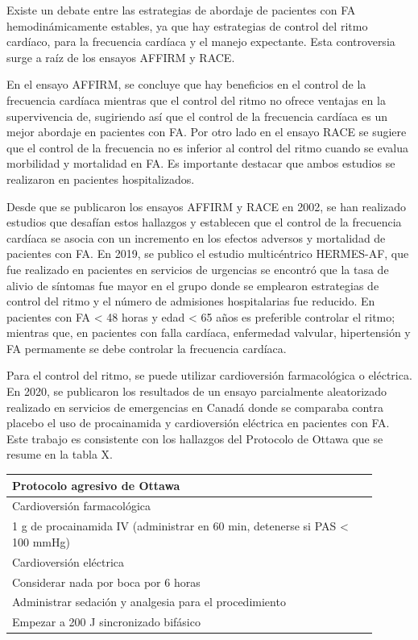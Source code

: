 \documentclass[a4paper]{article}
\let\cite=\supercite
\begin{document}
\begin{multicols}{3}
Existe un debate entre las estrategias de abordaje de pacientes con FA
hemodinámicamente estables, ya que hay estrategias de control del ritmo
cardíaco, para la frecuencia cardíaca y el manejo expectante. Esta
controversia surge a raíz de los ensayos AFFIRM\cite{AFFIRM} y RACE\cite{RACE}.

En el ensayo AFFIRM, se concluye que hay beneficios en el control de la
frecuencia cardíaca mientras que el control del ritmo no ofrece ventajas en la
supervivencia de, sugiriendo así que el control de la frecuencia cardíaca es un
mejor abordaje en pacientes con FA. Por otro lado en el ensayo RACE se sugiere
que el control de la frecuencia no es inferior al control del ritmo cuando se
evalua morbilidad y mortalidad en FA. Es importante destacar que ambos estudios
se realizaron en pacientes hospitalizados.

Desde que se publicaron los ensayos AFFIRM y RACE en 2002, se han realizado
estudios que desafían estos hallazgos y establecen que el control de la
frecuencia cardíaca se asocia con un incremento en los efectos adversos y
mortalidad de pacientes con FA\cite{malya}. En 2019, se publico el estudio
multicéntrico HERMES-AF, que fue realizado en pacientes en servicios de
urgencias se encontró que la tasa de alivio de síntomas fue mayor en el grupo
donde se emplearon estrategias de control del ritmo y el número de admisiones
hospitalarias fue reducido\cite{HERMESAF}. En pacientes con FA < 48 horas y
edad < 65 años es preferible controlar el ritmo; mientras que, en pacientes con
falla cardíaca, enfermedad valvular, hipertensión y FA permamente se debe
controlar la frecuencia cardíaca\cite{malya}.

Para el control del ritmo, se puede utilizar cardioversión farmacológica o
eléctrica. En 2020, se publicaron los resultados de un ensayo parcialmente
aleatorizado realizado en servicios de emergencias en Canadá donde se comparaba
contra placebo el uso de procainamida y cardioversión eléctrica en pacientes
con FA\cite{OTTAWA}. Este trabajo es consistente con los hallazgos del
Protocolo de Ottawa que se resume en la tabla X.

\begin{center}
\footnotesize
\centering
  \begin{tabular}{ p{0.9\linewidth} }
  \textbf{Protocolo agresivo de Ottawa} \\
  \hline
  \cellcolor[HTML]{CCCCCC} Cardioversión farmacológica \\
  \hline
  1 g de procainamida IV (administrar en 60 min, detenerse si PAS < 100 mmHg) \\
  \hline
  \cellcolor[HTML]{CCCCCC} Cardioversión eléctrica \\
  \hline
  Considerar nada por boca por 6 horas \\
  Administrar sedación y analgesia para el procedimiento  \\
  Empezar a 200 J sincronizado bifásico \\
\end{tabular}
\end{center}


\end{multicols}
\end{document}

